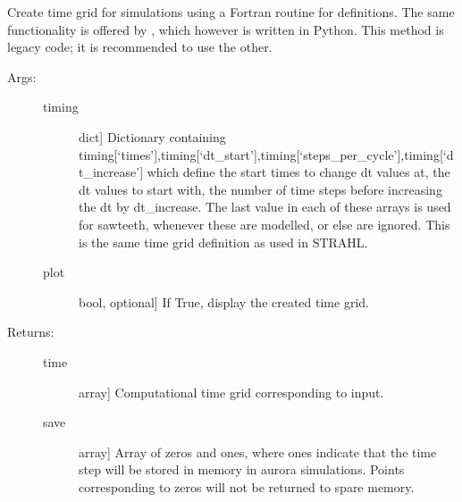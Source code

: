 \documentclass[letterpaper,10pt,english]{sphinxmanual}
\begin{document}
\begin{fulllineitems}
\label{\detokenize{aurora:aurora.grids_utils.create_aurora_time_grid}}
Create time grid for simulations using a Fortran routine for definitions. 
The same functionality is offered by , which however
is written in Python. This method is legacy code; it is recommended to use the other.
\begin{description}
\item[{Args:}] \leavevmode\begin{description}
\item[{timing}] \leavevmode{[}dict{]}
Dictionary containing 
timing{[}‘times’{]},timing{[}‘dt\_start’{]},timing{[}‘steps\_per\_cycle’{]},timing{[}‘dt\_increase’{]}
which define the start times to change dt values at, the dt values to start with,
the number of time steps before increasing the dt by dt\_increase. 
The last value in each of these arrays is used for sawteeth, whenever these are
modelled, or else are ignored. This is the same time grid definition as used in STRAHL.

\item[{plot}] \leavevmode{[}bool, optional{]}
If True, display the created time grid.

\end{description}

\item[{Returns:}] \leavevmode\begin{description}
\item[{time}] \leavevmode{[}array{]}
Computational time grid corresponding to  input.

\item[{save}] \leavevmode{[}array{]}
Array of zeros and ones, where ones indicate that the time step will be stored in memory
in aurora simulations. Points corresponding to zeros will not be returned to spare memory.

\end{description}

\end{description}

\end{fulllineitems}

\end{document}

